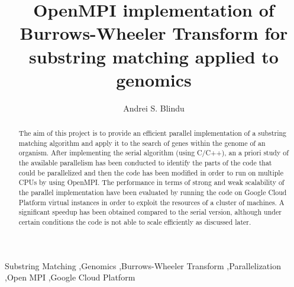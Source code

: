 \documentclass[final,5p,times,twocolumn,authoryear]{elsarticle}
\begin{document}
\begin{frontmatter}

\title{OpenMPI implementation of Burrows-Wheeler Transform for substring matching applied to genomics}

\author{Andrei S. Blindu}

\begin{abstract}
The aim of this project is to provide an efficient parallel implementation of a substring matching algorithm and apply it to the search of genes within the genome of an organism. After implementing the serial algorithm (using C/C++), an a priori study of the available parallelism has been conducted to identify the parts of the code that could be parallelized and then the code has been modified in order to run on multiple CPUs by using OpenMPI. The performance in terms of strong and weak scalability of the parallel implementation have been evaluated by running the code on Google Cloud Platform virtual instances in order to exploit the resources of a cluster of machines. A significant speedup has been obtained compared to the serial version, although under certain conditions the code is not able to scale efficiently as discussed later.
\end{abstract}

\begin{keyword}
Substring Matching \sep Genomics \sep Burrows-Wheeler Transform \sep Parallelization \sep Open MPI \sep Google Cloud Platform
\end{keyword}

\end{frontmatter}

\tableofcontents

\vspace{\baselineskip}

\end{document}
